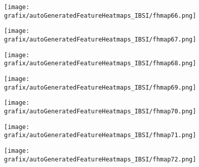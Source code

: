 \hspace{\hsp} 
\begin{subfigure}{\wid\textwidth} 
    \centering 
    \caption{\tiny \sffamily {}} 
    \vspace{\vsp} 
    \texttt{[image: grafix/autoGeneratedFeatureHeatmaps\_IBSI/fhmap66.png]} 
\end{subfigure} 
\hspace{\hsp} 
\begin{subfigure}{\wid\textwidth} 
    \centering 
    \caption{\tiny \sffamily {}} 
    \vspace{\vsp} 
    \texttt{[image: grafix/autoGeneratedFeatureHeatmaps\_IBSI/fhmap67.png]} 
\end{subfigure} 
\hspace{\hsp} 
\begin{subfigure}{\wid\textwidth} 
    \centering 
    \caption{\tiny \sffamily {}} 
    \vspace{\vsp} 
    \texttt{[image: grafix/autoGeneratedFeatureHeatmaps\_IBSI/fhmap68.png]} 
\end{subfigure} 
\hspace{\hsp} 
\begin{subfigure}{\wid\textwidth} 
    \centering 
    \caption{\tiny \sffamily {}} 
    \vspace{\vsp} 
    \texttt{[image: grafix/autoGeneratedFeatureHeatmaps\_IBSI/fhmap69.png]} 
\end{subfigure} 
\hspace{\hsp} 
\begin{subfigure}{\wid\textwidth} 
    \centering 
    \caption{\tiny \sffamily {}} 
    \vspace{\vsp} 
    \texttt{[image: grafix/autoGeneratedFeatureHeatmaps\_IBSI/fhmap70.png]} 
\end{subfigure} 
\hspace{\hsp} 
\begin{subfigure}{\wid\textwidth} 
    \centering 
    \caption{\tiny \sffamily {}} 
    \vspace{\vsp} 
    \texttt{[image: grafix/autoGeneratedFeatureHeatmaps\_IBSI/fhmap71.png]} 
\end{subfigure} 
\hspace{\hsp} 
\begin{subfigure}{\wid\textwidth} 
    \centering 
    \caption{\tiny \sffamily {}} 
    \vspace{\vsp} 
    \texttt{[image: grafix/autoGeneratedFeatureHeatmaps\_IBSI/fhmap72.png]} 
\end{subfigure} 

